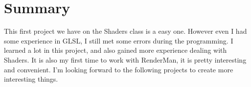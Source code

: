 \documentclass[letterpaper,14pt,titlepage,fleqn]{article}
\begin{document}
\section{Summary}
This first project we have on the Shaders class is a easy one. However even I had some experience in GLSL, I still met some errors during the programming. I learned a lot in this project, and also gained more experience dealing with Shaders. It is also my first time to work with RenderMan, it is pretty interesting and convenient. I'm looking forward to the following projects to create more interesting things.
\end{document}
